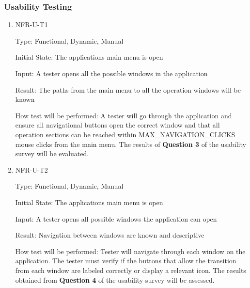 \documentclass[12pt, titlepage]{article}
\begin{document}
\subsubsection{Usability Testing}
\begin{enumerate}

\item{NFR-U-T1\\}

Type: Functional, Dynamic, Manual 
					
Initial State: The applications main menu is open
					
Input: A tester opens all the possible windows in the application
					
Result: The paths from the main menu to all the operation windows will be known
					
How test will be performed: A tester will go through the application and ensure all navigational buttons open the correct window and that all operation sections can be reached within MAX\_NAVIGATION\_CLICKS mouse clicks from the main menu. The results of \textbf{Question 3} of the usability survey will be evaluated.

\item{NFR-U-T2\\}

Type: Functional, Dynamic, Manual
					
Initial State: The applications main menu is open
					
Input: A tester opens all possible windows the application can open
					
Result: Navigation between windows are known and descriptive
					
How test will be performed: Tester will navigate through each window on the application. The tester must verify if the buttons that allow the transition from each window are labeled correctly or display a relevant icon. The results obtained from \textbf{Question 4} of the usability survey will be assessed.


\end{enumerate}
\end{document}
